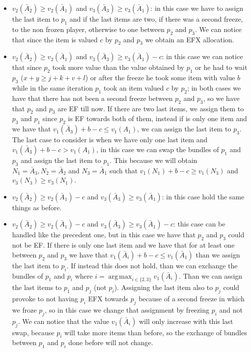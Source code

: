 \documentclass{article}
\DeclareMathOperator*{\argmax}{arg\,max}
\begin{document}
\begin{itemize}
    \item $v_2(\bar A_2) \ge v_2(\bar A_1)$ and $v_3(\bar A_3) \ge v_3(\bar A_1)$: in this case we have to assign the last item to $p_1$ and if the last items are two, if there was a second freeze, to the non frozen player, otherwise to one between $p_2$ and $p_3$. We can notice that since the item is valued $c$ by $p_2$ and $p_3$ we obtain an EFX allocation.
    \item $v_2(\bar A_2) \ge v_2(\bar A_1)$ and $v_3(\bar A_3) \ge v_3(\bar A_1) - c$: in this case we can notice that since $p_2$ took more value than the value obtained by $p_1$ or he had to wait $p_3$ ($x+y\ge j+k+v+l$) or after the freeze he took some item with value $b$ while in the same iteration $p_1$ took an item valued $c$ by $p_2$; in both cases we have that there has not been a second freeze between $p_2$ and $p_3$, so we have that $p_2$ and $p_3$ are EF till now. If there are two last items, we assign them to $p_3$ and $p_1$ since $p_2$ is EF towards both of them, instead if is only one item and we have that $v_1(\bar A_3) + b - c \le v_1(A_1)$, we can assign the last item to $p_3$. The last case to consider is when we have only one last item and $v_1(\bar A_3) + b - c > v_1(A_1)$, in this case we can swap the bundles of $p_1$ and $p_3$ and assign the last item to $p_1$. This because we will obtain $N_1 = \bar A_3, N_2 = \bar A_2$ and $N_3 = \bar A_1$ such that $v_1(N_1) + b - c\ge v_1(N_3)$ and $v_3(N_3) \ge v_3(N_1)$.
    \item $v_2(\bar A_2) \ge v_2(\bar A_1) - c$ and $v_3(\bar A_3) \ge v_3(\bar A_1)$: in this case hold the same things as before.
    \item $v_2(\bar A_2) \ge v_2(\bar A_1) - c$ and $v_3(\bar A_3) \ge v_3(\bar A_1) - c$: this case can be handled like the precedent one, but in this case we have that $p_2$ and $p_3$ could not be EF. If there is only one last item and we have that for at least one between $p_2$ and $p_3$ we have that $v_1(\bar A_i) + b - c \le v_1(\bar A_1)$ than we assign the last item to $p_i$. If instead this does not hold, than we can exchange the bundles of $p_1$ and $p_i$ where $i = \argmax_{i\in \{2,3\}} v_1(\bar A_i)$. Than we can assign the last items to $p_1$ and $p_j$ (not $p_i$). Assigning the last item also to $p_j$ could provoke to not having $p_i$ EFX towards $p_j$ because of a second freeze in which we froze $p_j$, so in this case we change that assignment by freezing $p_i$ and not $p_j$. We can notice that the value $v_1(\bar A_i)$ will only increase with this last swap, because $p_i$ will take more items than before, so the exchange of bundles between $p_1$ and $p_i$ done before will not change. 
     
\end{itemize}
\end{document}
